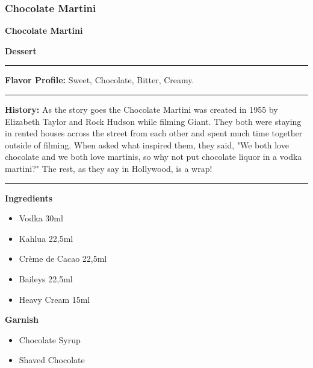 \subsubsection{Chocolate Martini}
\noindent
\begin{minipage}{.49\textwidth}
    \noindent\textbf{\LARGE Chocolate Martini}
\end{minipage}
\hspace{.02\textwidth}
\begin{minipage}{.49\textwidth}
    \raggedleft
    \textbf{\large Dessert}\\
\end{minipage}
\vspace{.5em}\hrule\vspace{.5em}
\noindent
\textbf{\large Flavor Profile:} Sweet, Chocolate, Bitter, Creamy.
\vspace{.5em}\hrule\vspace{.5em}
\noindent
\textbf{\large History:} As the story goes the Chocolate Martini was created in 1955 by Elizabeth Taylor and Rock Hudson while filming Giant. They both were staying in rented houses across the street from each other and spent much time together outside of filming. When asked what inspired them, they said, "We both love chocolate and we both love martinis, so why not put chocolate liquor in a vodka martini?" The rest, as they say in Hollywood, is a wrap!
\vspace{.5em}\hrule\vspace{.5em}
\noindent
\begin{minipage}[t]{.49\textwidth}
    \noindent
    \textbf{\large Ingredients}
    \begin{itemize}
        \item Vodka 30ml
        \item Kahlua 22,5ml
        \item Crème de Cacao 22,5ml
        \item Baileys 22,5ml
        \item Heavy Cream 15ml
    \end{itemize}
    \noindent
    \textbf{\large Garnish}
    \begin{itemize}
        \item Chocolate Syrup
        \item Shaved Chocolate
    \end{itemize}
\end{minipage}
